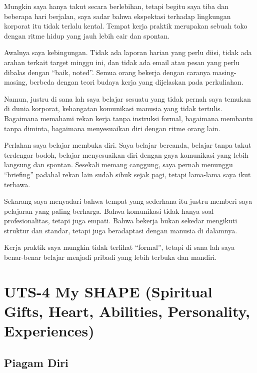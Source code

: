 \documentclass[
  letterpaper,
  DIV=11,
  numbers=noendperiod]{scrreprt}
\begin{document}
Mungkin saya hanya takut secara berlebihan, tetapi begitu saya tiba dan
beberapa hari berjalan, saya sadar bahwa ekspektasi terhadap lingkungan
korporat itu tidak terlalu kental. Tempat kerja praktik merupakan sebuah
toko dengan ritme hidup yang jauh lebih cair dan spontan.

Awalnya saya kebingungan. Tidak ada laporan harian yang perlu diisi,
tidak ada arahan terkait target minggu ini, dan tidak ada email atau
pesan yang perlu dibalas dengan ``baik, noted''. Semua orang bekerja
dengan caranya masing-masing, berbeda dengan teori budaya kerja yang
dijelaskan pada perkuliahan.

Namun, justru di sana lah saya belajar sesuatu yang tidak pernah saya
temukan di dunia korporat, kehangatan komunikasi manusia yang tidak
tertulis. Bagaimana memahami rekan kerja tanpa instruksi formal,
bagaimana membantu tanpa diminta, bagaimana menyesuaikan diri dengan
ritme orang lain.

Perlahan saya belajar membuka diri. Saya belajar bercanda, belajar tanpa
takut terdengar bodoh, belajar menyesuaikan diri dengan gaya komunikasi
yang lebih langsung dan spontan. Sesekali memang canggung, saya pernah
menunggu ``briefing'' padahal rekan lain sudah sibuk sejak pagi, tetapi
lama-lama saya ikut terbawa.

Sekarang saya menyadari bahwa tempat yang sederhana itu justru memberi
saya pelajaran yang paling berharga. Bahwa komunikasi tidak hanya soal
profesionalitas, tetapi juga empati. Bahwa bekerja bukan sekedar
mengikuti struktur dan standar, tetapi juga beradaptasi dengan manusia
di dalamnya.

Kerja praktik saya mungkin tidak terlihat ``formal'', tetapi di sana lah
saya benar-benar belajar menjadi pribadi yang lebih terbuka dan mandiri.


\chapter{UTS-4 My SHAPE (Spiritual Gifts, Heart, Abilities, Personality,
Experiences)}\label{uts-4-my-shape-spiritual-gifts-heart-abilities-personality-experiences}

\section{Piagam Diri}\label{piagam-diri}
\end{document}
